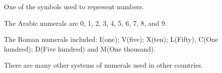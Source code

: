 One of the symbols used to represent numbers.
\par
The Arabic numerals are 0, 1, 2, 3, 4, 5, 6, 7, 8, and 9.


\par
The  Roman numerals  included:  I(one); V(five); X(ten); L(Fifty), 
C(One hundred); D(Five hundred) and M(One thousand).

\par
There are many other systems of numerals used in other countries.